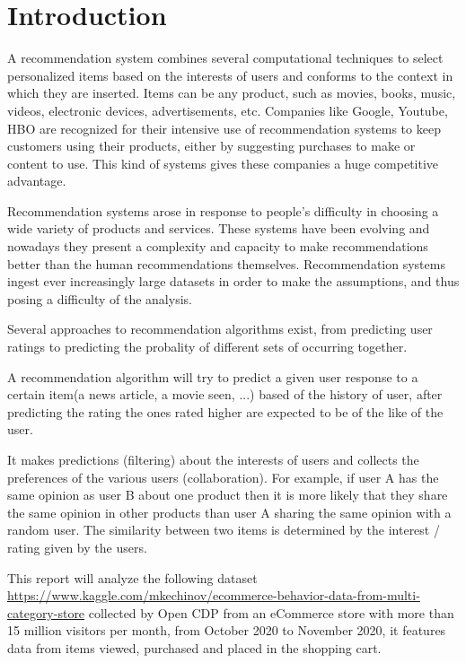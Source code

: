 \section{Introduction}
\label{intro}
A recommendation system combines several computational techniques to select personalized items based on the
interests of users and conforms to the context in which they are inserted.
Items can be any product, such as movies, books, music, videos, electronic devices, advertisements, etc.
Companies like Google, Youtube, HBO are recognized for their intensive use of recommendation systems to 
keep customers using their products, either by suggesting  purchases to make or content to use.
This kind of systems gives these companies a huge competitive advantage.

Recommendation systems arose in response to people's difficulty in choosing a wide variety of products and services.
These systems have been evolving and nowadays they present a complexity and capacity to make recommendations better
than the human recommendations themselves. Recommendation systems ingest ever increasingly large datasets in 
order to make the assumptions, and thus posing a difficulty of the analysis.

Several approaches to recommendation algorithms exist, from predicting user ratings to predicting the probality
of different sets of occurring together.


A recommendation algorithm will try to predict a given user response to a certain item(a news article, a movie seen, ...)
based of the history of user, after predicting the rating the ones rated higher are expected to be of the like
of the user.

It makes predictions (filtering) about the interests of users and collects the preferences of the various users (collaboration).
For example, if user A has the same opinion as user B about one product then it is more likely that they share
the same opinion in other products than user A sharing the same opinion with a random user.
The similarity between two items is determined by the interest / rating given by the users.

This report will analyze the following dataset 
\url{https://www.kaggle.com/mkechinov/ecommerce-behavior-data-from-multi-category-store}
collected by Open CDP from an eCommerce store with more than 15 million visitors per month,
 from October 2020 to November 2020, it features data from items viewed, purchased and placed in the shopping cart.
